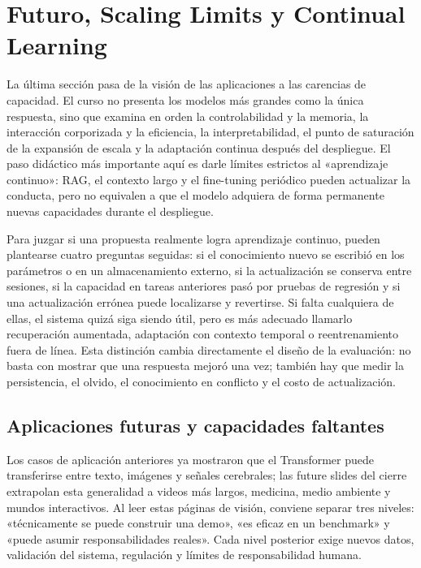 \section{Futuro, Scaling Limits y Continual Learning}

La última sección pasa de la visión de las aplicaciones a las carencias de capacidad. El curso no presenta los modelos más grandes como la única respuesta, sino que examina en orden la controlabilidad y la memoria, la interacción corporizada y la eficiencia, la interpretabilidad, el punto de saturación de la expansión de escala y la adaptación continua después del despliegue. El paso didáctico más importante aquí es darle límites estrictos al «aprendizaje continuo»: RAG, el contexto largo y el fine-tuning periódico pueden actualizar la conducta, pero no equivalen a que el modelo adquiera de forma permanente nuevas capacidades durante el despliegue.

Para juzgar si una propuesta realmente logra aprendizaje continuo, pueden plantearse cuatro preguntas seguidas: si el conocimiento nuevo se escribió en los parámetros o en un almacenamiento externo, si la actualización se conserva entre sesiones, si la capacidad en tareas anteriores pasó por pruebas de regresión y si una actualización errónea puede localizarse y revertirse. Si falta cualquiera de ellas, el sistema quizá siga siendo útil, pero es más adecuado llamarlo recuperación aumentada, adaptación con contexto temporal o reentrenamiento fuera de línea. Esta distinción cambia directamente el diseño de la evaluación: no basta con mostrar que una respuesta mejoró una vez; también hay que medir la persistencia, el olvido, el conocimiento en conflicto y el costo de actualización.

\subsection{Aplicaciones futuras y capacidades faltantes}

Los casos de aplicación anteriores ya mostraron que el Transformer puede transferirse entre texto, imágenes y señales cerebrales; las future slides del cierre extrapolan esta generalidad a videos más largos, medicina, medio ambiente y mundos interactivos. Al leer estas páginas de visión, conviene separar tres niveles: «técnicamente se puede construir una demo», «es eficaz en un benchmark» y «puede asumir responsabilidades reales». Cada nivel posterior exige nuevos datos, validación del sistema, regulación y límites de responsabilidad humana.


